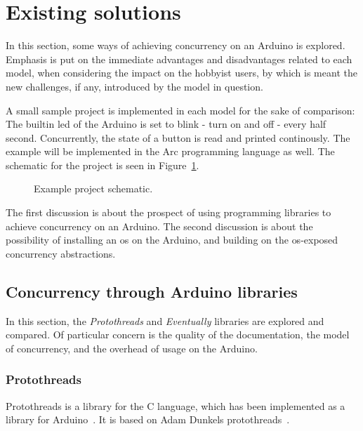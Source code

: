 \section{Existing solutions}\label{sec:existingsolutions}
In this section, some ways of achieving concurrency on an Arduino is explored. Emphasis is put on the immediate advantages and disadvantages related to each model, when considering the impact on the hobbyist users, by which is meant the new challenges, if any, introduced by the model in question.

A small sample project is implemented in each model for the sake of comparison: The builtin \gls{led} of the Arduino is set to blink - turn on and off - every half second. Concurrently, the state of a button is read and printed continously. The example will be implemented in the Arc programming language as well. The schematic for the project is seen in Figure~\ref{fig:exampleprojectschematic}.


\begin{figure}[htb!]
  \centering
  \caption{Example project schematic.}
  \label{fig:exampleprojectschematic}
\end{figure}


The first discussion is about the prospect of using programming libraries to achieve concurrency on an Arduino. The second discussion is about the possibility of installing an \gls{os} on the Arduino, and building on the \gls{os}-exposed concurrency abstractions.

\subsection{Concurrency through Arduino libraries}\label{subsec:arduinolibraries}
In this section, the \textit{Protothreads} and \textit{Eventually} libraries are explored and compared. Of particular concern is the quality of the documentation, the model of concurrency, and the overhead of usage on the Arduino.

\subsubsection{Protothreads}
Protothreads is a library for the C language, which has been implemented as a library for Arduino~\cite{Artin2020}. It is based on Adam Dunkels protothreads~\cite{AdamDunkelProtothreads}.


